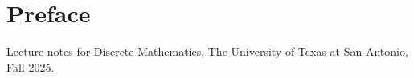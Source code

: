 \chapter{Preface}
Lecture notes for Discrete Mathematics, The University of Texas at San Antonio, Fall 2025.